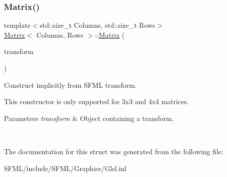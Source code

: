 \subsubsection{\texorpdfstring{Matrix()}{Matrix()}\hspace{0.1cm}{\footnotesize\ttfamily [2/2]}}
{\footnotesize\ttfamily template$<$std\+::size\+\_\+t Columns, std\+::size\+\_\+t Rows$>$ \\
\mbox{\hyperlink{struct_matrix}{Matrix}}$<$ Columns, Rows $>$\+::\mbox{\hyperlink{struct_matrix}{Matrix}} (\begin{DoxyParamCaption}\item[{const Transform \&}]{transform }\end{DoxyParamCaption})\hspace{0.3cm}{\ttfamily [inline]}}



Construct implicitly from S\+F\+ML transform. 

This constructor is only supported for 3x3 and 4x4 matrices.


\begin{DoxyParams}{Parameters}
{\em transform} & Object containing a transform. \begin{DoxyVerb}\end{DoxyVerb}
 \\
\hline
\end{DoxyParams}


The documentation for this struct was generated from the following file\+:\begin{DoxyCompactItemize}
\item 
S\+F\+M\+L/include/\+S\+F\+M\+L/\+Graphics/Glsl.\+inl\end{DoxyCompactItemize}
